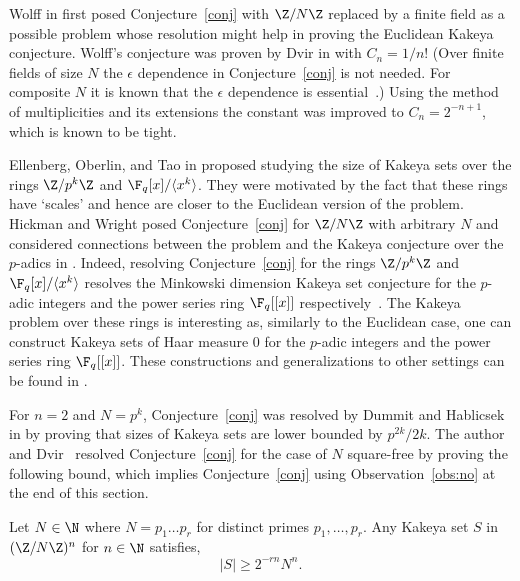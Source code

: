 Wolff in \cite{wolf1999} first posed Conjecture~\ref{conj} with $\Z/N\Z$ replaced by a finite field as a possible problem whose resolution might help in proving the Euclidean Kakeya conjecture. Wolff's conjecture was proven by Dvir in \cite{dvir2009size} with $C_{n}=1/n!$ (Over finite fields of size $N$ the $\epsilon$ dependence in Conjecture~\ref{conj} is not needed. For composite $N$ it is known that the $\epsilon$ dependence is essential~\cite{hickman2018fourier,dhar2021proof}.) Using the method of multiplicities and its extensions \cite{saraf2008,dvir2013extensions,bukh2021sharp} the constant was improved to $C_{n}=2^{-n+1}$, which is known to be tight. 

Ellenberg, Oberlin, and Tao in \cite{ellenberg2010kakeya} proposed studying the size of Kakeya sets over the rings $\Z/p^k\Z$ and $\F_q[x]/\langle x^k\rangle$. They were motivated by the fact that these rings have `scales' and hence are closer to the Euclidean version of the problem. Hickman and Wright posed Conjecture~\ref{conj} for $\Z/N\Z$ with arbitrary $N$ and considered connections between the problem and the Kakeya conjecture over the $p$-adics in \cite{hickman2018fourier}. Indeed, resolving Conjecture~\ref{conj} for the rings $\Z/p^k\Z$ and $\F_q[x]/\langle x^k\rangle$ resolves the Minkowski dimension Kakeya set conjecture for the $p$-adic integers and the power series ring $\F_q[[x]]$ respectively~\cite{ellenberg2010kakeya,dummithablicsek2013,hickman2018fourier}. The Kakeya problem over these rings is interesting as, similarly to the Euclidean case, one can construct Kakeya sets of Haar measure $0$ for the $p$-adic integers and the power series ring $\F_q[[x]]$. These constructions and generalizations to other settings can be found in \cite{dummithablicsek2013,Fraser_2016,CML_2018__10_1_3_0,hickman2018fourier}.

For $n=2$ and $N=p^k$, Conjecture~\ref{conj} was resolved by Dummit and Hablicsek in \cite{dummithablicsek2013} by proving that sizes of Kakeya sets are lower bounded by $p^{2k}/2k$. The author and Dvir~\cite{dhar2021proof} resolved Conjecture~\ref{conj} for the case of $N$ square-free by proving the following bound, which implies Conjecture~\ref{conj} using Observation~\ref{obs:no} at the end of this section.

\begin{thm}\label{squarefr}
Let $N\in \N$ where $N=p_1\hdots p_r$ for distinct primes $p_1,\hdots,p_r$. Any Kakeya set $S$ in $(\Z/N\Z)^n$ for $n\in \N$ satisfies,
$$|S|\ge 2^{-rn}N^n.$$
\end{thm}

